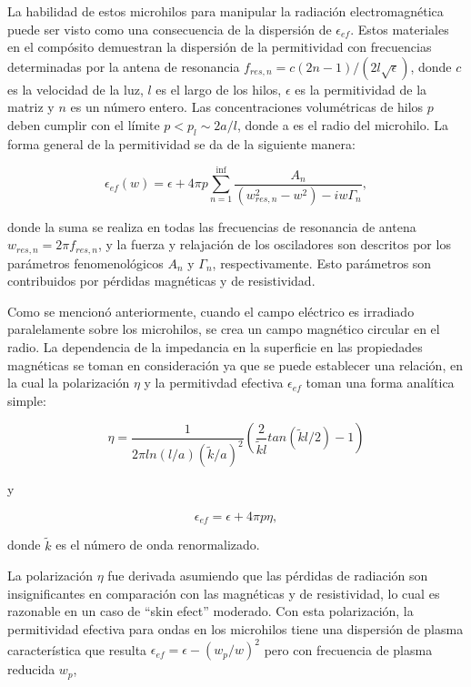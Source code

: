 \documentclass[12pt,letterpaper]{article}
\numberwithin{equation}{section}
\begin{document}
La habilidad de estos microhilos para manipular la radiación electromagnética puede ser visto como una consecuencia de la dispersión de $\epsilon_{ef}$. Estos materiales en el compósito demuestran la dispersión de la permitividad con frecuencias determinadas por la antena de resonancia $f_{res,n}= c(2n-1)/(2l\sqrt{\epsilon})$, donde $c$ es la velocidad de la luz, $l$ es el largo de los hilos, $\epsilon$ es la permitividad de la matriz y $n$ es un número entero. Las concentraciones volumétricas de hilos $p$ deben cumplir con el límite $p<p_{l} \sim 2a/l$, donde a es el radio del microhilo. La forma general de la permitividad se da de la siguiente manera:

\begin{equation}
\epsilon_{ef} (w)=\epsilon + 4 \pi p \sum_{n=1}^{\inf} \frac{A_{n}}{(w_{res,n}^2-w^2)-iw\Gamma_{n}}, 
\end{equation}

\noindent donde la suma se realiza en todas las frecuencias de resonancia de antena $w_{res,n}=2 \pi f_{res,n}$, y la fuerza y relajación de los osciladores son descritos por los parámetros fenomenológicos $A_n$ y $\Gamma_n$, respectivamente. Esto parámetros son contribuidos por pérdidas magnéticas y de resistividad. 

Como se mencionó anteriormente, cuando el campo eléctrico es irradiado paralelamente sobre los microhilos, se crea un campo magnético circular en el radio. La dependencia de la impedancia en la superficie en las propiedades magnéticas se toman en consideración ya que se puede establecer una relación, en la cual la polarización $\eta$ y la permitivdad efectiva $\epsilon_{ef}$ toman una forma analítica simple:

\begin{equation}
\eta = \frac{1}{2 \pi ln(l/a)(\tilde{k}/a)^2} \left( \frac{2}{\tilde{k}l}tan(\tilde{k}l/2)-1\right) 
\end{equation}

y

\begin{equation}
\epsilon_{ef} = \epsilon + 4 \pi p \eta, 
\end{equation}

\noindent donde $\tilde{k}$ es el número de onda renormalizado.

La polarización $\eta$ fue derivada asumiendo que las pérdidas de radiación son insignificantes en comparación con las magnéticas y de resistividad, lo cual es razonable en un caso de ``skin efect'' moderado. Con esta polarización, la permitividad efectiva para ondas en los microhilos tiene una dispersión de plasma característica que resulta $\epsilon_{ef}= \epsilon - (w_{p}/w)^2$ pero con frecuencia de plasma reducida  $w_{p}$,
\end{document}
